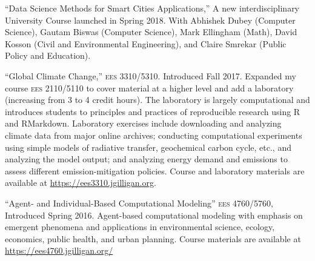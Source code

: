 %
%
\item ``Data Science Methods for Smart Cities Applications,'' A new interdisciplinary University Course launched in Spring 2018. With Abhishek Dubey (Computer Science), Gautam Biswas (Computer Science), Mark Ellingham (Math), David Kosson (Civil and Environmental Engineering), and Claire Smrekar (Public Policy and Education). 
\item ``Global Climate Change,'' \textsc{ees 3310/5310}. Introduced Fall 2017. Expanded my course \textsc{ees 2110/5110} to cover material at a higher level and add a laboratory (increasing from 3 to 4 credit hours).
The laboratory is largely computational and introduces students to principles and practices of reproducible research using R and RMarkdown. Laboratory exercises include downloading and analyzing climate data
from major online archives; conducting computational experiments using simple models of radiative transfer, geochemical carbon cycle, etc., and analyzing the model output; and analyzing energy demand and  emissions to assess different emission-mitigation policies. Course and laboratory materials are available at \url{https://ees3310.jgilligan.org}.
\item ``Agent- and Individual-Based Computational Modeling'' \textsc{ees 4760/5760}, Introduced Spring 2016. Agent-based computational modeling with emphasis on emergent phenomena and applications in environmental science, ecology, economics, public health, and urban planning. Course materials are available at \url{https://ees4760.jgilligan.org/}
